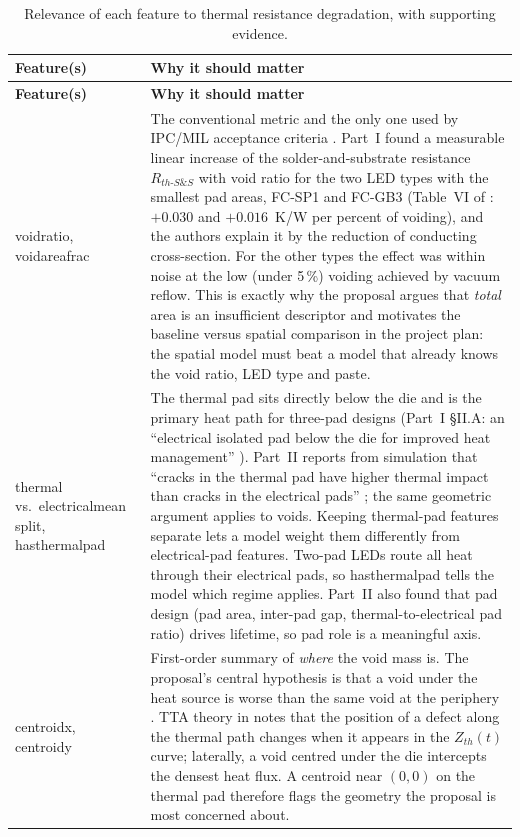 \documentclass[11pt,a4paper]{article}
\newcommand{\code}[1]{{\ttfamily\def\_{\textunderscore\allowbreak}#1}}
\begin{document}
\begin{longtable}{L{3.4cm} L{11.8cm}}
\caption{Relevance of each feature to thermal resistance degradation, with supporting evidence.}
\label{tab:relevance}\\
\toprule
\textbf{Feature(s)} & \textbf{Why it should matter} \\
\midrule
\endfirsthead
\toprule
\textbf{Feature(s)} & \textbf{Why it should matter} \\
\midrule
\endhead
\bottomrule
\endfoot

\code{void\_ratio}, \code{void\_area\_frac} &
The conventional metric and the only one used by IPC/MIL acceptance criteria \cite{proposal}.
Part~I found a measurable linear increase of the solder-and-substrate resistance $R_{th\text{-}S\&S}$
with void ratio for the two LED types with the smallest pad areas, FC-SP1 and FC-GB3
(Table~VI of \cite{part1}: $+0.030$ and $+0.016$~K/W per percent of voiding), and the authors
explain it by the reduction of conducting cross-section. For the other types the effect was
within noise at the low (under 5\,\%) voiding achieved by vacuum reflow. This is exactly why the
proposal argues that \emph{total} area is an insufficient descriptor and motivates the baseline
versus spatial comparison in the project plan: the spatial model must beat a model that already
knows the void ratio, LED type and paste. \\

\code{thermal\_*} vs.\ \code{electrical\_mean\_*} split, \code{has\_thermal\_pad} &
The thermal pad sits directly below the die and is the primary heat path for three-pad designs
(Part~I \S II.A: an ``electrical isolated pad below the die for improved heat management''
\cite{part1}). Part~II reports from simulation that ``cracks in the thermal pad have higher
thermal impact than cracks in the electrical pads'' \cite{part2}; the same geometric argument
applies to voids. Keeping thermal-pad features separate lets a model weight them differently
from electrical-pad features. Two-pad LEDs route all heat through their electrical pads, so
\code{has\_thermal\_pad} tells the model which regime applies. Part~II also found that pad
design (pad area, inter-pad gap, thermal-to-electrical pad ratio) drives lifetime, so pad role
is a meaningful axis. \\

\code{centroid\_x}, \code{centroid\_y} &
First-order summary of \emph{where} the void mass is. The proposal's central hypothesis is that
a void under the heat source is worse than the same void at the periphery \cite{proposal}.
TTA theory in \cite{zippelius2022,zippelius2026} notes that the position of a defect along the
thermal path changes when it appears in the $Z_{th}(t)$ curve; laterally, a void centred under
the die intercepts the densest heat flux. A centroid near $(0,0)$ on the thermal pad therefore
flags the geometry the proposal is most concerned about. \\


\end{longtable}
\end{document}
